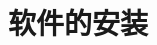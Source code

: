 \documentclass[10pt,a4paper]{article}
\begin{document}
\graphicspath{{figure/}}
%
\renewcommand{\abstractname}{\small{\CJKfamily{hei} 摘\quad 要}} %
\renewcommand{\refname}{\centering\CJKfamily{hei} 参考文献}
\renewcommand{\figurename}{{\bf Fig}.}
\renewcommand{\tablename}{{\bf Tab}.}

\makeatletter
\long{}
\makeatother

\newcommand{\keywords}[1]{{\hspace{0\ccwd}\small{\CJKfamily{hei} 关键词:}{\hspace{2ex}{#1}}\bigskip}}



\title{软件的安装}

\author{
\small
\small
}
\date{}					%
\maketitle
\end{document}

